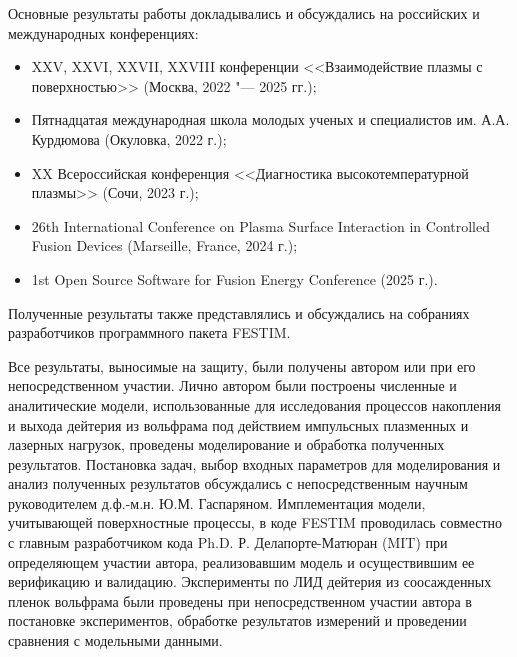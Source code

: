 {\probation}
Основные результаты работы докладывались и обсуждались на российских и международных конференциях:
\begin{itemize}
    \item XXV, XXVI, XXVII, XXVIII конференции <<Взаимодействие плазмы с поверхностью>> (Москва, 2022 "--- 2025 гг.);
    \item Пятнадцатая международная школа молодых ученых и специалистов им. А.А. Курдюмова (Окуловка, 2022 г.);
    \item XX Всероссийская конференция <<Диагностика высокотемпературной плазмы>> (Сочи, 2023 г.);
    \item 26th International Conference on Plasma Surface Interaction in Controlled Fusion Devices (Marseille, France, 2024 г.);
    \item 1st Open Source Software for Fusion Energy Conference (2025 г.).
\end{itemize}
Полученные результаты также представлялись и обсуждались на собраниях разработчиков программного пакета FESTIM. 

{\contribution} Все результаты, выносимые на защиту, были получены автором или при его непосредственном участии. Лично автором были построены численные и аналитические модели, использованные для исследования процессов накопления и выхода дейтерия из вольфрама под действием импульсных плазменных и лазерных нагрузок, проведены моделирование и обработка полученных результатов. Постановка задач, выбор входных параметров для моделирования и анализ полученных результатов обсуждались с непосредственным научным руководителем д.ф.-м.н. Ю.М. Гаспаряном. Имплементация модели, учитывающей поверхностные процессы, в коде FESTIM проводилась совместно с главным разработчиком кода Ph.D. Р. Делапорте-Матюран (MIT) при определяющем участии автора, реализовавшим модель и осуществившим ее верификацию и валидацию. Эксперименты по ЛИД дейтерия из соосажденных пленок вольфрама были проведены  при непосредственном участии автора в постановке экспериментов, обработке результатов измерений и проведении сравнения с модельными данными.


